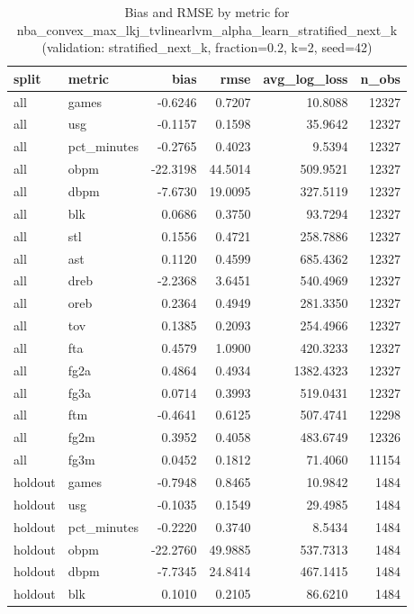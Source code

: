 \begin{table}
\caption{Bias and RMSE by metric for nba_convex_max_lkj_tvlinearlvm_alpha_learn_stratified_next_k (validation: stratified_next_k, fraction=0.2, k=2, seed=42)}
\label{tab:nba_convex_max_lkj_tvlinearlvm_alpha_learn_stratified_next_k_vs_stratified_next_k_f20_k2_s42_bias_rmse}
\begin{tabular}{llrrrr}
\toprule
split & metric & bias & rmse & avg\_log\_loss & n\_obs \\
\midrule
all & games & -0.6246 & 0.7207 & 10.8088 & 12327 \\
all & usg & -0.1157 & 0.1598 & 35.9642 & 12327 \\
all & pct\_minutes & -0.2765 & 0.4023 & 9.5394 & 12327 \\
all & obpm & -22.3198 & 44.5014 & 509.9521 & 12327 \\
all & dbpm & -7.6730 & 19.0095 & 327.5119 & 12327 \\
all & blk & 0.0686 & 0.3750 & 93.7294 & 12327 \\
all & stl & 0.1556 & 0.4721 & 258.7886 & 12327 \\
all & ast & 0.1120 & 0.4599 & 685.4362 & 12327 \\
all & dreb & -2.2368 & 3.6451 & 540.4969 & 12327 \\
all & oreb & 0.2364 & 0.4949 & 281.3350 & 12327 \\
all & tov & 0.1385 & 0.2093 & 254.4966 & 12327 \\
all & fta & 0.4579 & 1.0900 & 420.3233 & 12327 \\
all & fg2a & 0.4864 & 0.4934 & 1382.4323 & 12327 \\
all & fg3a & 0.0714 & 0.3993 & 519.0431 & 12327 \\
all & ftm & -0.4641 & 0.6125 & 507.4741 & 12298 \\
all & fg2m & 0.3952 & 0.4058 & 483.6749 & 12326 \\
all & fg3m & 0.0452 & 0.1812 & 71.4060 & 11154 \\
holdout & games & -0.7948 & 0.8465 & 10.9842 & 1484 \\
holdout & usg & -0.1035 & 0.1549 & 29.4985 & 1484 \\
holdout & pct\_minutes & -0.2220 & 0.3740 & 8.5434 & 1484 \\
holdout & obpm & -22.2760 & 49.9885 & 537.7313 & 1484 \\
holdout & dbpm & -7.7345 & 24.8414 & 467.1415 & 1484 \\
holdout & blk & 0.1010 & 0.2105 & 86.6210 & 1484 \\

\end{tabular}
\end{table}

